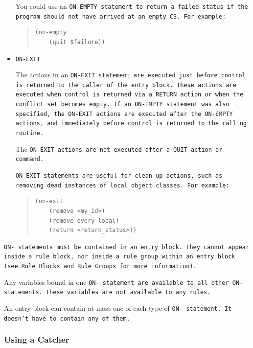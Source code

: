 \begin{itemize}
  You could use an \tt{ON-EMPTY} statement to return a failed status
  if the program should not have arrived at an empty CS.  For example:
  \begin{quote}
\begin{verbatim}
(on-empty
    (quit $failure))
\end{verbatim}
  \end{quote}
        
\item \tt{ON-EXIT}

  The actions in an \tt{ON-EXIT} statement are executed just before
  control is returned to the caller of the entry block. These actions
  are executed when control is returned via a \tt{RETURN} action or
  when the conflict set becomes empty. If an \tt{ON-EMPTY} statement
  was also specified, the \tt{ON-EXIT} actions are executed after the
  \tt{ON-EMPTY} actions, and immediately before control is returned to
  the calling routine.

  The \tt{ON-EXIT} actions are not executed after a \tt{QUIT} action
  or command.

  \tt{ON-EXIT} statements are useful for clean-up actions, such as
  removing dead instances of local object classes. For example:

  \begin{quote}
\begin{verbatim}
(on-exit
    (remove <my_id>)
    (remove-every local)
    (return <return_status>))
\end{verbatim}
  \end{quote}

\end{itemize}

\tt{ON-} statements must be contained in an entry block. They cannot
appear inside a rule block, nor inside a rule group within an entry
block (see Rule Blocks and Rule Groups for more information).

\begin{note}
  Any variables bound in one \tt{ON-} statement are available to all
  other \tt{ON-} statements. These variables are not available to any
  rules.
\end{note}

An entry block can contain at most one of each type of \tt{ON-}
statement. It doesn't have to contain any of them.

\subsubsection*{Using a Catcher}

